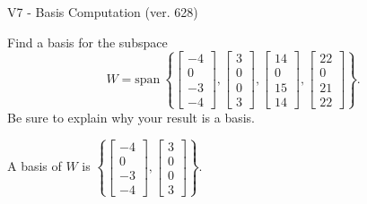 \begin{exercise}
  \begin{exerciseTitle}V7 - Basis Computation (ver. 628)\end{exerciseTitle}
  \begin{exerciseStatement}
    Find a basis for the subspace 
\[W=\mathrm{span}\ \left\{\left[\begin{array}{r}
-4 \\
0 \\
-3 \\
-4
\end{array}\right] , \left[\begin{array}{r}
3 \\
0 \\
0 \\
3
\end{array}\right] , \left[\begin{array}{r}
14 \\
0 \\
15 \\
14
\end{array}\right] , \left[\begin{array}{r}
22 \\
0 \\
21 \\
22
\end{array}\right]\right\}.\]
 Be sure to explain why your result is a basis.


  \end{exerciseStatement}
  \begin{exerciseAnswer}
   A basis of \(W\) is  \(\left\{\left[\begin{array}{r}
-4 \\
0 \\
-3 \\
-4
\end{array}\right] , \left[\begin{array}{r}
3 \\
0 \\
0 \\
3
\end{array}\right]\right\}\).
  


  \end{exerciseAnswer}
\end{exercise}